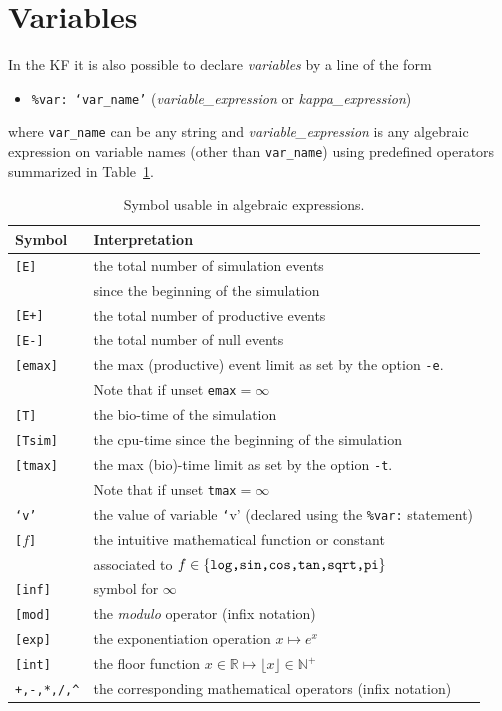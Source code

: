 \documentclass[11pt]{book}
\def\ttt#1{\texttt{#1}}
\def\set#1{\{#1\}}
\def\ITE#1{\begin{itemize}#1\end{itemize}}
\def\Real{\mathbb R}
\def\Nat{\mathbb N}
\begin{document}
\section{Variables}\label{sec:var}

In the KF it is also possible to declare \emph{variables} by a line of the form
\ITE{
\item[] \ttt{\%var: `var\_name'} (\textit{variable\_expression} or \textit{kappa\_expression})
}
where \ttt{var\_name} can be any string and \textit{variable\_expression} is any algebraic expression on variable names (other than \ttt{var\_name})  using predefined operators summarized in Table~\ref{tab:operators}.

\begin{table}[htbp]
\centering
\begin{tabular}{@{} l|l @{} }
\toprule
Symbol & Interpretation \\
\midrule
\ttt{[E]} & the total number of simulation events\index{event}\\
& since the beginning of the simulation \\
\ttt{[E+]} & the total number of productive events\index{event} \\
\ttt{[E-]} & the total number of null events\index{event}\\
\ttt{[emax]} & the max (productive) event limit as set by the option \ttt{-e}. \\ &Note that if unset \ttt{emax}$=\infty$\\
\ttt{[T]} & the bio-time of the simulation \\
\ttt{[Tsim]} & the cpu-time since the beginning of the simulation \\
\ttt{[tmax]} & the max (bio)-time limit as set by the option \ttt{-t}. \\ &Note that if unset \ttt{tmax}$=\infty$\\

\ttt{`v'} & the value of variable {\ttt `v'} (declared using the \ttt{\%var:} statement) \\
\ttt{[}$f$\texttt{]} & the intuitive mathematical function or constant \\ &associated to $f\in\set{\hbox{\ttt{log,sin,cos,tan,sqrt,pi}}}$ \\
\ttt{[inf]} & symbol for $\infty$ \\
\ttt{[mod]} & the \emph{modulo} operator (infix notation)\\
\ttt{[exp]} & the exponentiation operation $x\mapsto e^x$ \\
\ttt{[int]} & the floor function $x\in\Real\mapsto \lfloor x\rfloor\in\Nat^+$ \\
\ttt{+,-,*,/,\^} & the corresponding mathematical operators (infix notation)\\
\bottomrule
\end{tabular}\caption{Symbol usable in algebraic expressions.}
\label{tab:operators}
\end{table}
\end{document}
